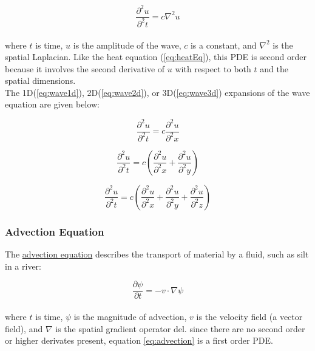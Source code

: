 { \begin{equation}\label{eq:waveEq}
 \frac{\partial^{2}u}{\partial^{2}t} = c\nabla^{2}u
   \end{equation}
     \\
 where $t$ is time, $u$ is the amplitude of the wave, $c$ is a constant, and $\nabla^{2}$ is the spatial Laplacian.  Like the heat equation (\ref{eq:heatEq}), this PDE is second order because it involves the second derivative of $u$ with respect to both $t$ and the spatial dimensions. \\
 
The 1D(\ref{eq:wave1d}), 2D(\ref{eq:wave2d}), or 3D(\ref{eq:wave3d}) expansions of the wave equation are given below:
 
 \begin{equation}\label{eq:wave1d}
  \frac{\partial^{2}u}{\partial^{2}t} = c\frac{\partial^{2}u}{\partial^{2}x}
  \end{equation}
  
   \begin{equation}\label{eq:wave2d}
  \frac{\partial^{2}u}{\partial^{2}t} = c\left(\frac{\partial^{2}u}{\partial^{2}x}+\frac{\partial^{2}u}{\partial^{2}y}\right)
  \end{equation}
  
   \begin{equation}\label{eq:wave3d}
  \frac{\partial^{2}u}{ \partial^{2}t} = c\left(\frac{\partial^{2}u}{\partial^{2}x}+\frac{\partial^{2}u}{\partial^{2}y}+\frac{\partial^{2}u}{\partial^{2}z} \right)
  \end{equation}
    
  \subsubsection{Advection Equation}
  
  The \href{https://en.wikipedia.org/wiki/Advection}{advection equation} describes the transport of material by a fluid, such as silt in a river:
  
   \begin{equation}\label{eq:advection}
  \frac{\partial \psi}{\partial t} = -v \cdot \nabla\psi
  \end{equation}
   \\
    where $t$ is time, $\psi$ is the magnitude of advection, $v$ is the velocity field (a vector field), and $\nabla$ is the spatial gradient operator del.  since there are no second order or higher derivates present, equation \ref{eq:advection} is a first order PDE.\\
    
}

